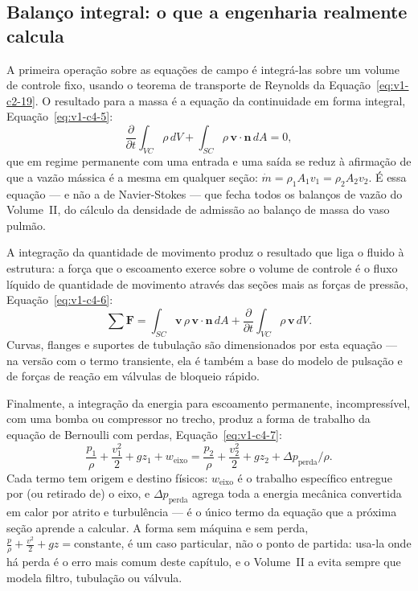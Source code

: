 \documentclass[12pt,a4paper]{article}
\numberwithin{equation}{section}
\numberwithin{table}{section}
\numberwithin{figure}{section}
\begin{document}
\subsection{Balanço integral: o que a engenharia realmente
calcula}\label{sub:v1-c4-integral}

A primeira operação sobre as equações de campo é integrá-las sobre um volume
de controle fixo, usando o teorema de transporte de Reynolds da
Equação~\eqref{eq:v1-c2-19}. O resultado para a massa é a equação da
continuidade em forma integral, Equação~\eqref{eq:v1-c4-5}:
\begin{equation}\label{eq:v1-c4-5}
\frac{\partial}{\partial t}\int_{VC}\rho\,dV +
\int_{SC}\rho\,\mathbf{v}\cdot\mathbf{n}\,dA = 0 ,
\end{equation}
que em regime permanente com uma entrada e uma saída se reduz à afirmação de
que a vazão mássica é a mesma em qualquer seção: $\dot{m} = \rho_1 A_1 v_1 =
\rho_2 A_2 v_2$. É essa equação --- e não a de Navier-Stokes --- que fecha
todos os balanços de vazão do Volume~II, do cálculo da densidade de admissão
ao balanço de massa do vaso pulmão.

A integração da quantidade de movimento produz o resultado que liga o fluido
à estrutura: a força que o escoamento exerce sobre o volume de controle é o
fluxo líquido de quantidade de movimento através das seções mais as forças de
pressão, Equação~\eqref{eq:v1-c4-6}:
\begin{equation}\label{eq:v1-c4-6}
\sum\mathbf{F} = \int_{SC}\mathbf{v}\,\rho\,\mathbf{v}\cdot\mathbf{n}\,dA +
\frac{\partial}{\partial t}\int_{VC}\rho\,\mathbf{v}\,dV .
\end{equation}
Curvas, flanges e suportes de tubulação são dimensionados por esta equação ---
na versão com o termo transiente, ela é também a base do modelo de pulsação e
de forças de reação em válvulas de bloqueio rápido.

Finalmente, a integração da energia para escoamento permanente,
incompressível, com uma bomba ou compressor no trecho, produz a forma de
trabalho da equação de Bernoulli com perdas, Equação~\eqref{eq:v1-c4-7}:
\begin{equation}\label{eq:v1-c4-7}
\frac{p_1}{\rho} + \frac{v_1^2}{2} + g z_1 + w_{\text{eixo}} =
\frac{p_2}{\rho} + \frac{v_2^2}{2} + g z_2 + \Delta p_{\text{perda}}/\rho .
\end{equation}
Cada termo tem origem e destino físicos: $w_{\text{eixo}}$ é o trabalho
específico entregue por (ou retirado de) o eixo, e $\Delta p_{\text{perda}}$
agrega toda a energia mecânica convertida em calor por atrito e turbulência ---
é o único termo da equação que a próxima seção aprende a calcular. A forma
sem máquina e sem perda, $\tfrac{p}{\rho} + \tfrac{v^2}{2} + gz =
\text{constante}$, é um caso particular, não o ponto de partida: usa-la onde
há perda é o erro mais comum deste capítulo, e o Volume~II a evita sempre que
modela filtro, tubulação ou válvula.
\end{document}

